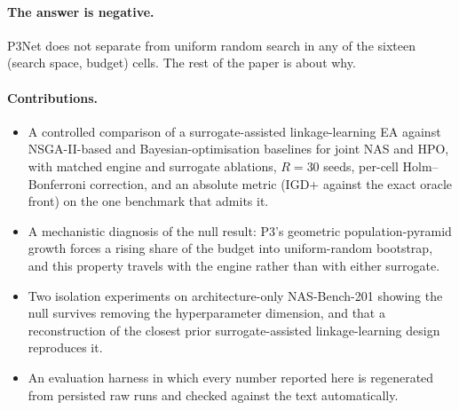 \paragraph{The answer is negative.} P3Net does not separate from uniform random search in any of the sixteen
(search space, budget) cells. The rest of the paper is about why.

\paragraph{Contributions.}
\begin{itemize}
    \item A controlled comparison of a surrogate-assisted linkage-learning EA against NSGA-II-based and
    Bayesian-optimisation baselines for joint NAS and HPO, with matched engine and surrogate ablations,
    $R=30$ seeds, per-cell Holm--Bonferroni correction, and an absolute metric (IGD+ against the exact oracle
    front) on the one benchmark that admits it.
    \item A mechanistic diagnosis of the null result: P3's geometric population-pyramid growth forces a rising
    share of the budget into uniform-random bootstrap, and this property travels with the engine rather than
    with either surrogate.
    \item Two isolation experiments on architecture-only NAS-Bench-201 showing the null survives removing the
    hyperparameter dimension, and that a reconstruction of the closest prior surrogate-assisted
    linkage-learning design~\citep{bartnik2026evolutionary} reproduces it.
    \item An evaluation harness in which every number reported here is regenerated from persisted raw runs
    and checked against the text automatically.
\end{itemize}
